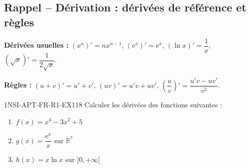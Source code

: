 

\subsection*{Rappel -- Dérivation : dérivées de référence et règles}

\textbf{Dérivées usuelles :} $(x^n)' = n x^{n-1}$, $(\mathrm{e}^x)' = \mathrm{e}^x$, $(\ln x)' = \dfrac{1}{x}$, $(\sqrt{x})' = \dfrac{1}{2\sqrt{x}}$.

\textbf{Règles :} $(u+v)' = u' + v'$, $(uv)' = u'v + uv'$, $\left(\dfrac{u}{v}\right)' = \dfrac{u'v - uv'}{v^2}$.

\begin{exercice}{1NSI-APT-FR-R1-EX1}{1}{8}
Calculer les dérivées des fonctions suivantes :
\begin{enumerate}
  \item $f(x) = x^4 - 3x^2 + 5$
  \item $g(x) = \dfrac{\mathrm{e}^x}{x}$ sur $\mathbb{R}^*$
  \item $h(x) = x \ln x$ sur $]0, +\infty[$
\end{enumerate}
\end{exercice}

